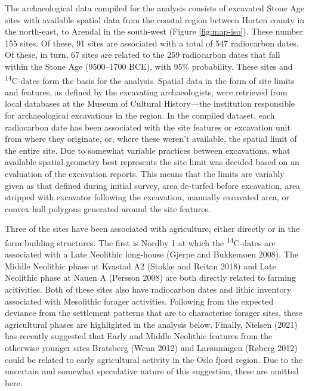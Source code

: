 \documentclass[
]{article}
\begin{document}
The archaeological data compiled for the analysis consists of excavated Stone Age sites with available spatial data from the coastal region between Horten county in the north-east, to Arendal in the south-west (Figure \ref{fig:map-iso}). These number 155 sites. Of these, 91 sites are associated with a total of 547 radiocarbon dates. Of these, in turn, 67 sites are related to the 259 radiocarbon dates that fall within the Stone Age (9500--1700 BCE), with 95\% probability. These sites and \textsuperscript{14}C-dates form the basis for the analysis. Spatial data in the form of site limits and features, as defined by the excavating archaeologists, were retrieved from local databases at the Museum of Cultural History---the institution responsible for archaeological excavations in the region. In the compiled dataset, each radiocarbon date has been associated with the site features or excavation unit from where they originate, or, where these weren't available, the spatial limit of the entire site. Due to somewhat variable practices between excavations, what available spatial geometry best represents the site limit was decided based on an evaluation of the excavation reports. This means that the limits are variably given as that defined during initial survey, area de-turfed before excavation, area stripped with excavator following the excavation, manually excavated area, or convex hull polygons generated around the site features.

Three of the sites have been associated with agriculture, either directly or in the form building structures. The first is Nordby 1 at which the \textsuperscript{14}C-dates are associated with a Late Neolithic long-house (Gjerpe and Bukkemoen 2008). The Middle Neolithic phase at Kvastad A2 (Stokke and Reitan 2018) and Late Neolithic phase at Nauen A (Persson 2008) are both directly related to farming acitivities. Both of these sites also have radiocarbon dates and lithic inventory associated with Mesolithic forager activities. Following from the expected deviance from the settlement patterns that are to characterise forager sites, these agricultural phases are highlighted in the analysis below. Finally, Nielsen (2021) has recently suggested that Early and Middle Neolithic features from the otherwise younger sites Bratsberg (Wenn 2012) and Larønningen (Røberg 2012) could be related to early agricultural activity in the Oslo fjord region. Due to the uncertain and somewhat speculative nature of this suggestion, these are omitted here.
\end{document}
